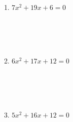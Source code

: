 \documentclass[12pt]{article}
\begin{document}
\begin{enumerate}
\begin{enumerate}
        \item $7x^2 + 19x + 6 = 0$
        \[
        \begin{array}{c}
        \\ \\ \\ \\ \\ \\ \\ \\ \\ \\ \\ \\
        \end{array}
        \]

        \item $6x^2 + 17x + 12 = 0$
        \[
        \begin{array}{c}
        \\ \\ \\ \\ \\ \\ \\ \\ \\ \\ \\ \\
        \end{array}
        \]

        \item $5x^2 + 16x + 12 = 0$
        \[
        \begin{array}{c}
        \\ \\ \\ \\ \\ \\ \\ \\ \\ \\ \\ \\
        \end{array}
        \]
    \end{enumerate}


\end{enumerate}
\end{document}
